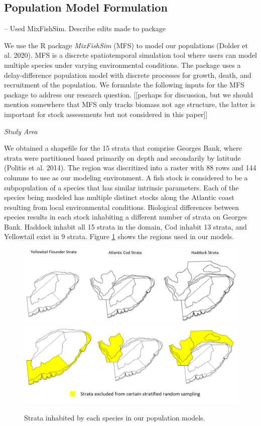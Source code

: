 \documentclass[
  12pt,
]{article}
\begin{document}
\subsection{Population Model Formulation}

-- Used MixFishSim. Describe edits made to package

We use the R package \emph{MixFishSim} (MFS) to model our populations (Dolder et al. 2020). MFS is a discrete spatiotemporal simulation tool where users can model multiple species under varying environmental conditions. The package uses a delay-difference population model with discrete processes for growth, death, and recruitment of the population. We formulate the following inputs for the MFS package to address our research question. {[}{[}perhaps for discussion, but we should mention somewhere that MFS only tracks biomass not age structure, the latter is important for stock assessments but not considered in this paper{]}{]}

\emph{Study Area}

We obtained a shapefile for the 15 strata that comprise Georges Bank, where strata were partitioned based primarily on depth and secondarily by latitude (Politis et al. 2014). The region was discritized into a raster with 88 rows and 144 columns to use as our modeling environment. A fish stock is considered to be a subpopulation of a species that has similar intrinsic parameters. Each of the species being modeled has multiple distinct stocks along the Atlantic coast resulting from local environmental conditions. Biological differences between species results in each stock inhabiting a different number of strata on Georges Bank. Haddock inhabit all 15 strata in the domain, Cod inhabit 13 strata, and Yellowtail exist in 9 strata. Figure \ref{fig:strata-plot} shows the regions used in our models.

\begin{figure}

{\centering \includegraphics[width=0.95\linewidth]{Images/Strata} \includegraphics[width=0.95\linewidth]{Images/Excluded_strata} 

}

\caption{Strata inhabited by each species in our population models.}\label{fig:strata-plot}
\end{figure}
\end{document}
